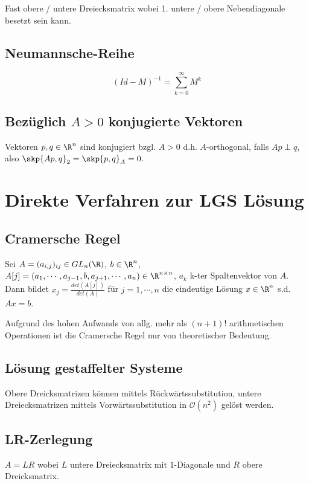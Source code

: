 Fast obere / untere Dreiecksmatrix wobei 1. untere / obere Nebendiagonale besetzt sein kann.

\subsection*{Neumannsche-Reihe}

\vspace{-2mm}
$$(Id-M)^{-1} = \sum_{k=0}^\infty M^k$$

\subsection*{Bezüglich $A > 0$ konjugierte Vektoren}

Vektoren $p, q \in \R^n$ sind konjugiert bzgl. $A > 0$ d.h. $A$-orthogonal, falls $Ap \perp q$, also $\skp{Ap,q}_2=\skp{p,q}_A=0$.

\section*{Direkte Verfahren zur LGS Lösung}

\subsection*{Cramersche Regel}

Sei $A = (a_{i,j})_{ij} \in GL_n(\R)$, $b \in \R^n$, $A[j] = (a_1, \cdots, a_{j-1}, b, a_{j+1}, \cdots, a_n) \in \R^{n \times n}$, $a_k$ k-ter Spaltenvektor von $A$. Dann bildet $x_j = \frac{det(A[j])}{det(A)}$ für $j = 1, \cdots, n$ die eindeutige Lösung $x \in \R^n$ s.d. $Ax=b$.

Aufgrund des hohen Aufwands von allg. mehr als $(n+1)!$ arithmetischen Operationen ist die Cramersche Regel nur von theoretischer Bedeutung.

\subsection*{Lösung gestaffelter Systeme}

Obere Dreicksmatrizen können mittels Rückwärtssubstitution, untere Dreiecksmatrizen mittels Vorwärtssubstitution in $\mathcal{O}(n^2)$ gelöst werden.

\subsection*{LR-Zerlegung}

$A = LR$ wobei $L$ untere Dreiecksmatrix mit $1$-Diagonale und $R$ obere Dreicksmatrix.

